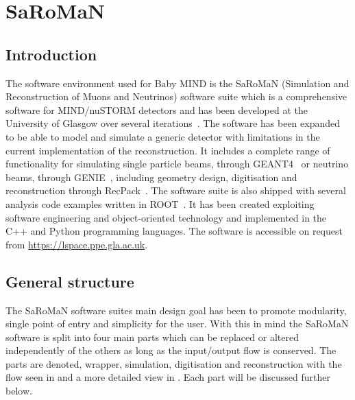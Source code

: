 \chapter{SaRoMaN}
\label{c:software}

\section{Introduction}

The software environment used for Baby MIND is the SaRoMaN (Simulation and Reconstruction of Muons and Neutrinos) software suite which is a comprehensive software for MIND/nuSTORM detectors and has been developed at the University of Glasgow over several iterations~\cite{27Bross,  53Laing, 54NUFACT2016Hallsjo}. The software has been expanded to be able to model and simulate a generic detector with limitations in the current implementation of the reconstruction. It includes a complete range of functionality for simulating single particle beams, through GEANT4~\cite{Geant4} or neutrino beams, through GENIE~\cite{Genie}, including geometry design, digitisation and reconstruction through RecPack~\cite{RecPack}. The software suite is also shipped with several analysis code examples written in ROOT~\cite{Root}. It has been created exploiting software engineering and object-oriented technology and implemented in the C++ and Python programming languages. The software is accessible on request from \url{https://lspace.ppe.gla.ac.uk}. 

\section{General structure}
The SaRoMaN software suites main design goal has been to promote modularity, single point of entry and simplicity for the user. With this in mind the SaRoMaN software is split into four main parts which can be replaced or altered independently of the others as long as the input/output flow is conserved. The parts are denoted, wrapper, simulation, digitisation and reconstruction with the flow seen in  and a more detailed view in . Each part will be discussed further below.

